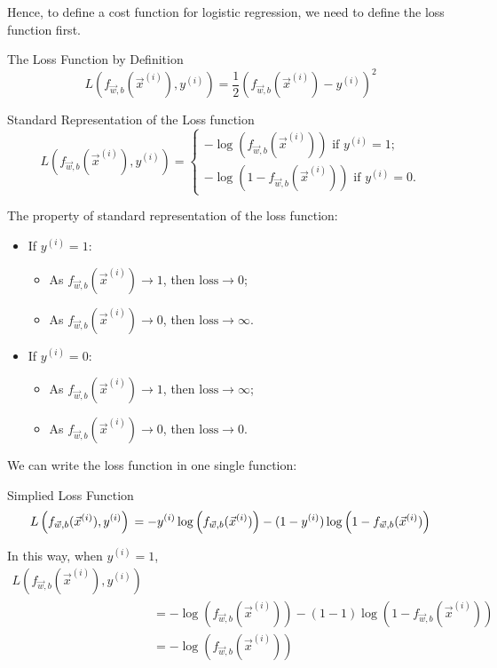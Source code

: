 \documentclass[12pt,a4paper]{article}
\begin{document}
Hence, to define a cost function for logistic regression, we need to define the loss function first. 
\begin{thmbox}{The Loss Function by Definition}
$$L\left(f_{\vec{w},b}(\vec{x}^{(i)}),y^{(i)}\right)=\frac{1}{2}\left(f_{\vec{w},b}(\vec{x}^{(i)})-y^{(i)}\right)^2$$	
\end{thmbox}

\begin{thmbox}{Standard Representation of the Loss function}
	$$L\left(f_{\vec{w},b}(\vec{x}^{(i)}),y^{(i)}\right)=
	\begin{cases}
	-\log\left(f_{\vec{w},b}(\vec{x}^{(i)})\right)\text{ if }y^{(i)}=1;\\
	-\log\left(1-f_{\vec{w},b}(\vec{x}^{(i)})\right)\text{ if }y^{(i)}=0.
	\end{cases}$$
\end{thmbox}

The property of standard representation of the loss function: 
\begin{itemize}
	\item If $y^{(i)}=1$: 
		\begin{itemize}
			\item As $f_{\vec{w},b}(\vec{x}^{(i)})\to1$, then $\text{loss}\to0$; 
			\item As $f_{\vec{w},b}(\vec{x}^{(i)})\to0$, then $\text{loss}\to\infty$. 
		\end{itemize}
	\item If $y^{(i)}=0$: 
		\begin{itemize}
			\item As $f_{\vec{w},b}(\vec{x}^{(i)})\to1$, then $\text{loss}\to\infty$; 
			\item As $f_{\vec{w},b}(\vec{x}^{(i)})\to0$, then $\text{loss}\to0$. 
		\end{itemize}
\end{itemize}

We can write the loss function in one single function: 
\begin{thmbox}{Simplied Loss Function}
	$$L\left(f_{\vec{w},b}(\vec{x}^{(i)}),y^{(i)}\right)\\=-y^{(i)}\log\left(f_{\vec{w},b}(\vec{x}^{(i)})\right)-(1-y^{(i)})\log\left(1-f_{\vec{w},b}(\vec{x}^{(i)})\right)$$
\end{thmbox}

In this way, when $y^{(i)}=1$, 
$$\begin{aligned}
	L\left(f_{\vec{w},b}(\vec{x}^{(i)}),y^{(i)}\right)&\\
	&=-\log\left(f_{\vec{w},b}(\vec{x}^{(i)})\right)-(1-1)\log\left(1-f_{\vec{w},b}(\vec{x}^{(i)})\right)\\
	&=-\log\left(f_{\vec{w},b}(\vec{x}^{(i)})\right)
	\end{aligned}$$
\end{document}
